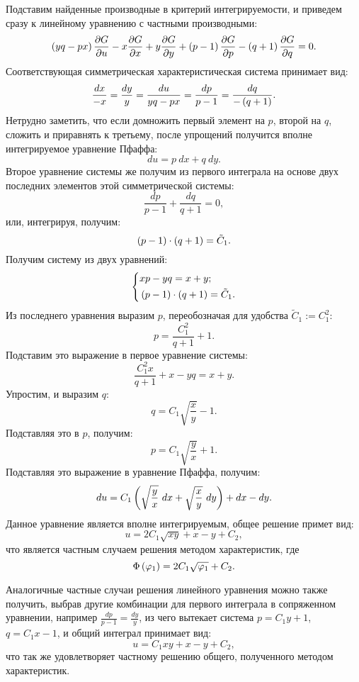 		Подставим найденные производные в критерий интегрируемости, и приведем сразу к линейному уравнению с частными производными:
		\[ \left( yq - px \right) \dfrac{\partial G}{\partial u} - x \dfrac{\partial G}{\partial x} + y \dfrac{\partial G}{\partial y} + \left( p - 1 \right) \dfrac{\partial G}{\partial p} - \left( q + 1 \right) \dfrac{\partial G}{\partial q} = 0. \] 
		Соответствующая симметрическая характеристическая система принимает вид:
		\[ \frac{dx}{-x} = \frac{dy}{y} = \frac{du}{yq - px} = \frac{dp}{p-1} = \frac{dq}{-\left( q + 1 \right)}. \]
		Нетрудно заметить, что если домножить первый элемент на $p$, второй на $q$, сложить и приравнять к третьему, после упрощений получится вполне интегрируемое уравнение Пфаффа:
		\[ du = p ~ dx + q ~ dy. \]
		Второе уравнение системы же получим из первого интеграла на основе двух последних элементов этой симметрической системы:
		\[ \frac{dp}{p-1} + \frac{dq}{q+1} = 0, \]
		или, интегрируя, получим:
		\[ \left( p-1 \right) \cdot \left( q+1 \right) = \tilde{C}_1. \]
		Получим систему из двух уравнений:
		\[ \left\lbrace \begin{split} 
			&xp - yq = x + y; \\
			&\left( p-1 \right) \cdot \left( q+1 \right) = \tilde{C}_1.
		\end{split} \right. \]
		Из последнего уравнения выразим $p$, переобозначая для удобства $\tilde{C}_1 := C_1^2$:
		\[ p = \frac{C_1^2}{q+1} + 1. \]
		Подставим это выражение в первое уравнение системы:
		\[ \frac{C_1^2 x}{q + 1} + x - yq = x + y. \]
		Упростим, и выразим $q$:
		\[ q = C_1 \sqrt{\frac{x}{y}} - 1. \]
		Подставляя это в $p$, получим:
		\[ p = C_1 \sqrt{\frac{y}{x}} + 1. \]
		Подставляя это выражение в уравнение Пфаффа, получим:
		\[ du = C_1 \left( \sqrt{\frac{y}{x}} ~ dx + \sqrt{\frac{x}{y}} ~ dy  \right) + dx - dy. \]
		Данное уравнение является вполне интегрируемым, общее решение примет вид:
		\[ u = 2C_1 \sqrt{xy} + x - y + C_2, \]
		что является частным случаем решения методом характеристик, где
		\[ \Phi \left( \varphi_1 \right) = 2C_1 \sqrt{\varphi_1} + C_2. \]

		Аналогичные частные случаи решения линейного уравнения можно также получить, выбрав другие комбинации для первого интеграла в сопряженном уравнении, например $\frac{dp}{p-1} = \frac{dy}{y}$, из чего вытекает система $p = C_1 y + 1$, $q = C_1 x - 1$, и общий интеграл принимает вид:
		\[ u = C_1 xy + x - y + C_2, \]
		что так же удовлетворяет частному решению общего, полученного методом характеристик.

